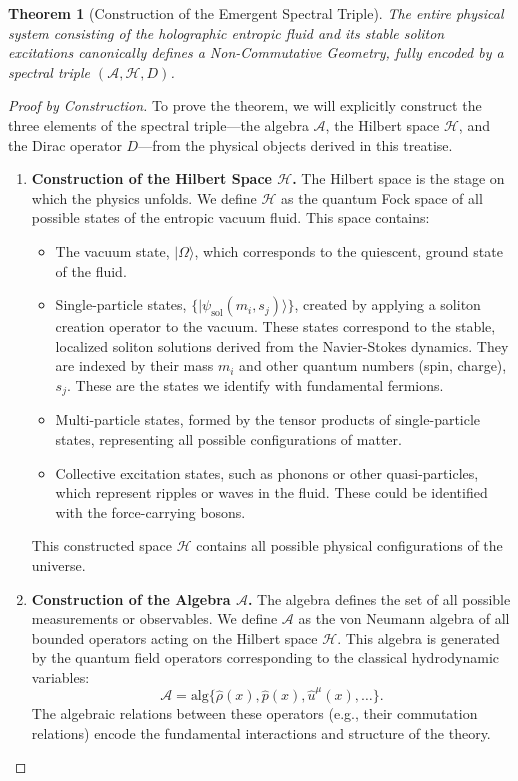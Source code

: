 \documentclass[11pt, letterpaper]{report}
\theoremstyle{plain} %
\newtheorem{theorem}{Theorem}[chapter]
\theoremstyle{definition} %
\theoremstyle{remark} %
\begin{document}
\begin{theorem}[Construction of the Emergent Spectral Triple]
\label{thm:emergent_spectral_triple}
The entire physical system consisting of the holographic entropic fluid and its stable soliton excitations canonically defines a Non-Commutative Geometry, fully encoded by a spectral triple $(\mathcal{A}, \mathcal{H}, D)$.
\end{theorem}
\begin{proof}[Proof by Construction]
To prove the theorem, we will explicitly construct the three elements of the spectral triple—the algebra $\mathcal{A}$, the Hilbert space $\mathcal{H}$, and the Dirac operator $D$—from the physical objects derived in this treatise.

\begin{enumerate}
    \item \textbf{Construction of the Hilbert Space $\mathcal{H}$.}
    The Hilbert space is the stage on which the physics unfolds. We define $\mathcal{H}$ as the quantum Fock space of all possible states of the entropic vacuum fluid. This space contains:
    \begin{itemize}
        \item The vacuum state, $|\Omega\rangle$, which corresponds to the quiescent, ground state of the fluid.
        \item Single-particle states, $\{|\psi_{\text{sol}}(m_i, s_j)\rangle\}$, created by applying a soliton creation operator to the vacuum. These states correspond to the stable, localized soliton solutions derived from the Navier-Stokes dynamics. They are indexed by their mass $m_i$ and other quantum numbers (spin, charge), $s_j$. These are the states we identify with fundamental fermions.
        \item Multi-particle states, formed by the tensor products of single-particle states, representing all possible configurations of matter.
        \item Collective excitation states, such as phonons or other quasi-particles, which represent ripples or waves in the fluid. These could be identified with the force-carrying bosons.
    \end{itemize}
    This constructed space $\mathcal{H}$ contains all possible physical configurations of the universe.

    \item \textbf{Construction of the Algebra $\mathcal{A}$.}
    The algebra defines the set of all possible measurements or observables. We define $\mathcal{A}$ as the von Neumann algebra of all bounded operators acting on the Hilbert space $\mathcal{H}$. This algebra is generated by the quantum field operators corresponding to the classical hydrodynamic variables:
    \begin{equation}
        \mathcal{A} = \text{alg} \{ \hat{\rho}(x), \hat{p}(x), \hat{u}^\mu(x), \dots \}.
    \end{equation}
    The algebraic relations between these operators (e.g., their commutation relations) encode the fundamental interactions and structure of the theory.


\end{enumerate}
\end{proof}
\end{document}
